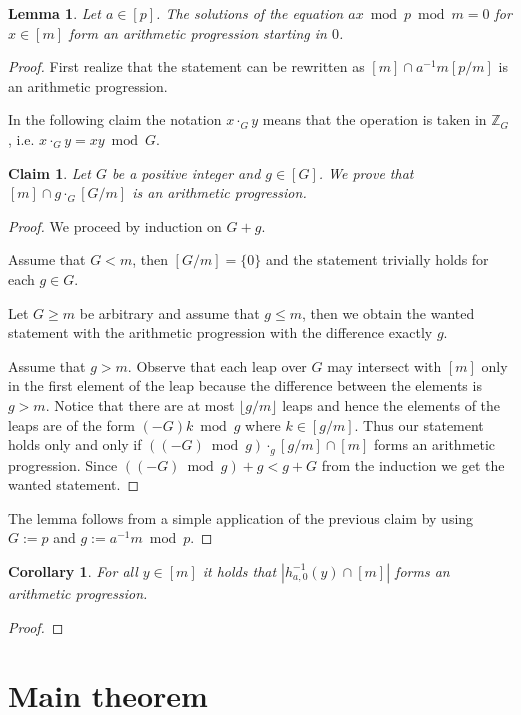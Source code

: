 \documentclass{article}
\newtheorem{lemma}{Lemma}
\newtheorem{claim}{Claim}
\newtheorem{corollary}{Corollary}
\begin{document}
\begin{lemma}
Let $a \in [p]$. The solutions of the equation $ax \bmod p \bmod m = 0$ for $x \in [m]$ form an arithmetic progression starting in $0$.
\end{lemma}
\begin{proof}
First realize that the statement can be rewritten as $[m] \cap a^{-1}m [p/m]$ is an arithmetic progression.

In the following claim the notation $x \cdot_G y$ means that the operation is taken in $\mathbb{Z}_{G}$, i.e. $x \cdot_G y = xy \bmod G$. 
\begin{claim}
\label{claim:arithmetic-progression}
Let $G$ be a positive integer and $g \in [G]$. We prove that $[m] \cap g \cdot_{G} [G/m]$ is an arithmetic progression.
\end{claim}
\begin{proof}
We proceed by induction on $G + g$.

Assume that $G < m$, then $[G/m] = \{0\}$ and the statement trivially holds for each $g \in G$.

Let $G \geq m$ be arbitrary and assume that $g \leq m$, then we obtain the wanted statement with the arithmetic progression with the difference exactly $g$.

Assume that $g > m$.
Observe that each leap over $G$ may intersect with $[m]$ only in the first element of the leap because the difference between the elements is $g > m$.
Notice that there are at most $\lfloor g/m \rfloor$ leaps and hence the elements of the leaps are of the form $(-G)k \bmod g$ where $k \in [g/m]$.
Thus our statement holds only and only if $((-G) \bmod g) \cdot_g [g/m] \cap [m]$ forms an arithmetic progression. Since $((-G) \bmod g) + g < g + G$ from the induction we get the wanted statement.
\end{proof}
The lemma follows from a simple application of the previous claim by using $G := p$ and $g := a^{-1}m \bmod p$.
\end{proof}

\begin{corollary}
For all $y \in [m]$ it holds that $|h_{a, 0}^{-1}(y) \cap [m]|$ forms an arithmetic progression.
\end{corollary}
\begin{proof}
\end{proof}

\section{Main theorem}
\end{document}
